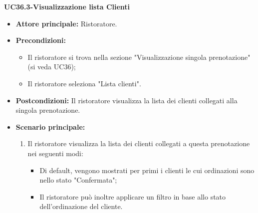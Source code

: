 \pagebreak

\textbf{UC36.3-Visualizzazione lista Clienti}
\begin{itemize}
    \item \textbf{Attore principale:} Ristoratore.
    \item \textbf{Precondizioni:}
    \begin{itemize}
        \item Il ristoratore si trova nella sezione "Visualizzazione singola prenotazione" (si veda UC36);
        \item Il ristoratore seleziona "Lista clienti".
    \end{itemize}
    \item \textbf{Postcondizioni:} Il ristoratore visualizza la lista dei clienti collegati alla singola prenotazione.
    \item \textbf{Scenario principale:}
    \begin{enumerate}
        \item Il ristoratore visualizza la lista dei clienti collegati a questa prenotazione nei seguenti modi:
        \begin{itemize}
            \item Di default, vengono mostrati per primi i clienti le cui ordinazioni sono nello stato "Confermata";
            \item Il ristoratore può inoltre applicare un filtro in base allo stato dell'ordinazione del cliente.
        \end{itemize}
    \end{enumerate}
\end{itemize}

